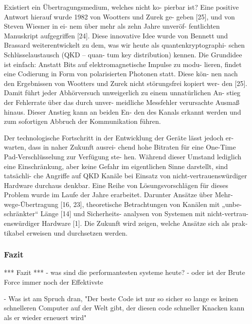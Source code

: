 Existiert ein Übertragungsmedium, welches nicht ko- pierbar ist? Eine positive Antwort hierauf wurde 1982 von Wootters und Zurek ge- geben [25], und von Steven Wiesner in ei- nem über mehr als zehn Jahre unveröf- fentlichten Manuskript aufgegriffen [24]. Diese innovative Idee wurde von Bennett und Brassard weiterentwickelt zu dem, was wir heute als quantenkryptographi- schen Schlüsselaustausch (QKD – quan- tum key distribution) kennen.
Die Grundidee ist einfach: Anstatt Bits auf elektromagnetische Impulse zu modu- lieren, findet eine Codierung in Form von polarisierten Photonen statt. Diese kön- nen nach den Ergebnissen von Wootters und Zurek nicht störungsfrei kopiert wer- den [25]. Damit führt jeder Abhörversuch unweigerlich zu einem unnatürlichen An- stieg der Fehlerrate über das durch unver- meidliche Messfehler verursachte Ausmaß hinaus. Dieser Anstieg kann an beiden En- den des Kanals erkannt werden und zum sofortigen Abbruch der Kommunikation führen.

Der technologische Fortschritt in der Entwicklung der Geräte lässt jedoch er- warten, dass in naher Zukunft ausrei- chend hohe Bitraten für eine One-Time Pad-Verschlüsselung zur Verfügung ste- hen. Während dieser Umstand lediglich eine Einschränkung, aber keine Gefahr im eigentlichen Sinne darstellt, sind tatsächli- che Angriffe auf QKD Kanäle bei Einsatz von nicht-vertrauenswürdiger Hardware durchaus denkbar.
Eine Reihe von Lösungsvorschlägen für dieses Problem wurde im Laufe der Jahre erarbeitet. Darunter Ansätze über Mehr- wege-Übertragung [16, 23], theoretische Betrachtungen von Kanälen mit „unbe- schränkter“ Länge [14] und Sicherheits- analysen von Systemen mit nicht-vertrau- enswürdiger Hardware [1]. Die Zukunft wird zeigen, welche Ansätze sich als prak- tikabel erweisen und durchsetzen werden.




\subsubsection{Fazit}

*** Fazit ***
- was sind die performantesten systeme heute?
- oder ist der Brute Force immer noch der Effektivste

- Was ist am Spruch dran, "Der beste Code ist nur so sicher so lange es keinen schnelleren Computer auf der Welt gibt, der diesen code schneller Knacken kann als er wieder erneuert wird"
